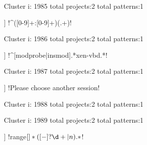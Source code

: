 Cluster i: 1985
total projects:2
total patterns:1
\begin{multicols}{1}
\begin{description}[noitemsep,topsep=0pt]
\item [[2] ] \cverb!^\s*([0-9]+:[0-9]+)\s*(.+)!
\end{description}
\end{multicols}







Cluster i: 1986
total projects:2
total patterns:1
\begin{multicols}{1}
\begin{description}[noitemsep,topsep=0pt]
\item [[2] ] \cverb!^[modprobe|insmod].*xen-vbd.*!
\end{description}
\end{multicols}







Cluster i: 1987
total projects:2
total patterns:1
\begin{multicols}{1}
\begin{description}[noitemsep,topsep=0pt]
\item [[2] ] \cverb!Please choose another session!
\end{description}
\end{multicols}







Cluster i: 1988
total projects:2
total patterns:1
\begin{multicols}{1}
\end{multicols}







Cluster i: 1989
total projects:2
total patterns:1
\begin{multicols}{1}
\begin{description}[noitemsep,topsep=0pt]
\item [[2] ] \cverb!range\([ ]*([-]?\d+|n).*\)!
\end{description}
\end{multicols}







